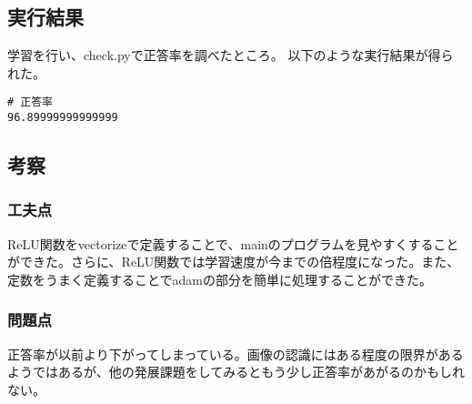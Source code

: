 \documentclass{ujarticle}
\begin{document}
\subsection{実行結果}
学習を行い、check.pyで正答率を調べたところ。
以下のような実行結果が得られた。
\begin{lstlisting}[basicstyle=\ttfamily\footnotesize, frame=single]
# 正答率
96.89999999999999
\end{lstlisting}


\subsection{考察}
\subsubsection{工夫点}
ReLU関数をvectorizeで定義することで、mainのプログラムを見やすくすることができた。さらに、ReLU関数では学習速度が今までの倍程度になった。また、定数をうまく定義することでadamの部分を簡単に処理することができた。

\subsubsection{問題点}
正答率が以前より下がってしまっている。画像の認識にはある程度の限界があるようではあるが、他の発展課題をしてみるともう少し正答率があがるのかもしれない。
\end{document}
